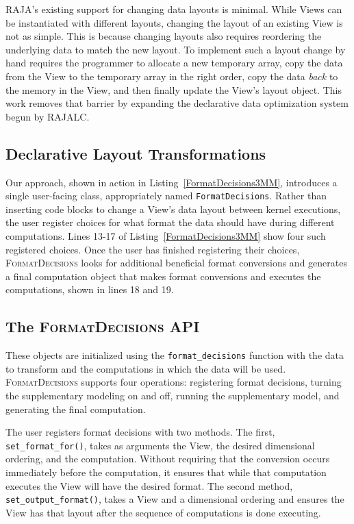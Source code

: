 \documentclass[sigconf,review=true]{acmart}
\newcommand{\FormatDecisions}[0]{{\textsc{FormatDecisions}}}
\begin{document}
RAJA's existing support for changing data layouts is minimal. 
While Views can be instantiated with different layouts, changing the layout of an existing View is not as simple.
This is because changing layouts also requires reordering the underlying data to match the new layout. 
To implement such a layout change by hand requires the programmer to allocate a new temporary array, 
copy the data from the View to the temporary array in the right order, 
copy the data \textit{back} to the memory in the View, 
and then finally update the View's layout object.
This work removes that barrier by expanding the declarative data optimization system begun by RAJALC.

\subsection{Declarative Layout Transformations}
Our approach, shown in action in Listing~\ref{FormatDecisions3MM}, introduces a single user-facing class, appropriately named \verb.FormatDecisions..
Rather than inserting code blocks to change a View's data layout between kernel executions, the user register choices for what format the data should have during different computations. Lines 13-17 of Listing~\ref{FormatDecisions3MM} show four such registered choices.
Once the user has finished registering their choices, \FormatDecisions{} looks for additional beneficial format conversions and generates a final computation object that makes format conversions and executes the computations, shown in lines 18 and 19.

\subsection{The \FormatDecisions{} API}
These objects are initialized using the \verb.format_decisions. function with the data to transform and the computations in which the data will be used.
\FormatDecisions{} supports four operations: registering format decisions, turning the supplementary modeling on and off, running the supplementary model, and generating the final computation.

The user registers format decisions with two methods.
The first, \verb.set_format_for()., takes as arguments the View, the desired dimensional ordering, and the computation.
Without requiring that the conversion occurs immediately before the computation, it ensures that while that computation executes the View will have the desired format.
The second method, \verb.set_output_format()., takes a View and a dimensional ordering and ensures the View has that layout after the sequence of computations is done executing.
\end{document}

